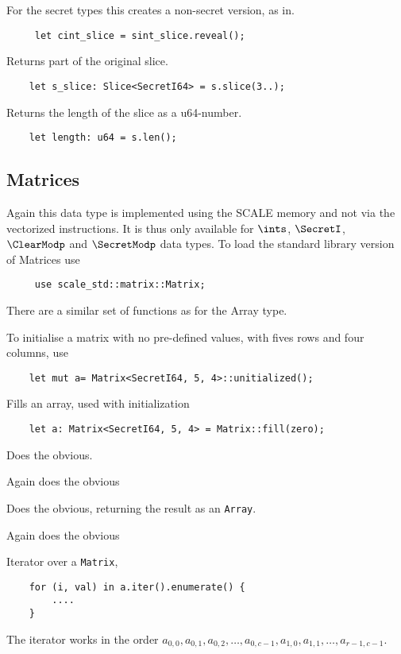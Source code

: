 For the secret types this creates a non-secret version, as in.
\begin{lstlisting}
     let cint_slice = sint_slice.reveal();
\end{lstlisting}

Returns part of the original slice.
\begin{lstlisting}
    let s_slice: Slice<SecretI64> = s.slice(3..);
\end{lstlisting}

Returns the length of the slice as a u64-number.
\begin{lstlisting}
    let length: u64 = s.len();
\end{lstlisting}

\subsection{Matrices}
\label{sec:matrices}
Again this data type is implemented using the SCALE memory and not
via the vectorized instructions.
It is thus only available for $\ints$, $\SecretI$, $\ClearModp$
and $\SecretModp$ data types.
To load the standard library version of Matrices use
\begin{lstlisting}
     use scale_std::matrix::Matrix;
\end{lstlisting}
There are a similar set of functions as for the Array type.

To initialise a matrix with no pre-defined values, with
fives rows and four columns, use
\begin{lstlisting}
    let mut a= Matrix<SecretI64, 5, 4>::unitialized();
\end{lstlisting}


Fills an array, used with initialization
\begin{lstlisting}
    let a: Matrix<SecretI64, 5, 4> = Matrix::fill(zero);
\end{lstlisting}


Does the obvious.

Again does the obvious

Does the obvious, returning the result as an \verb|Array|.

Again does the obvious


Iterator over a \verb|Matrix|,
\begin{lstlisting}
    for (i, val) in a.iter().enumerate() {
        ....
    }
\end{lstlisting}
The iterator works in the order
$a_{0,0}, a_{0,1}, a_{0,2}, \ldots, a_{0,c-1}, a_{1,0}, a_{1,1}, \ldots, a_{r-1,c-1}$.

